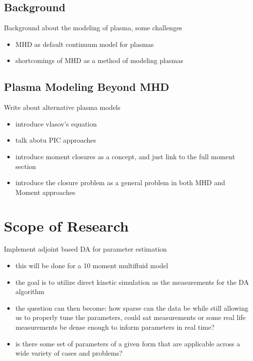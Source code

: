 \documentclass[titlepage,12pt,letterpaper]{article}
\begin{document}
\subsection{Background}\label{intro:background}

Background about the modeling of plasma, some challenges
\begin{itemize}
  \item MHD as default continuum model for plasmas
  \item shortcomings of MHD as a method of modeling plasmas
\end{itemize}


\subsection{Plasma Modeling Beyond MHD}\label{intro:modeling}

Write about alternative plasma models
\begin{itemize}
  \item introduce vlasov's equation
  \item talk abotu PIC approaches
  \item introduce moment closures as a concept, and just link to the full moment section
  \item introduce the closure problem as a general problem in both MHD and Moment approaches
\end{itemize}



\section{Scope of Research}\label{scope}

Implement adjoint based DA for parameter estimation
\begin{itemize}
  \item this will be done for a 10 moment multifluid model
  \item the goal is to utilize direct kinetic simulation as the measurements for the DA algorithm
  \item the question can then become: how sparse can the data be while still allowing us to properly tune the parameters, could sat measurements or some real life measurements be dense enough to inform parameters in real time?
  \item is there some set of parameters of a given form that are applicable across a wide variety of cases and problems?
\end{itemize}
\end{document}
